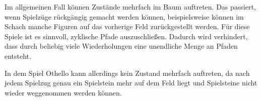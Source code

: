 Im allgemeinen Fall können Zustände mehrfach im Baum auftreten. Das passiert, wenn Spielzüge rückgängig gemacht werden
können, beispielsweise können im Schach manche Figuren auf das vorherige Feld zurückgestellt werden. Für diese Spiele
ist es sinnvoll, zyklische Pfade auszuschließen. Dadurch wird verhindert, dass durch beliebig viele Wiederholungen eine
unendliche Menge an Pfaden entsteht.
\cite[S.~75]{ai2010russel}

In dem Spiel Othello kann allerdings kein Zustand mehrfach auftreten, da nach jedem Spielzug genau ein Spielstein mehr
auf dem Feld liegt und Spielsteine nicht wieder weggenommen werden können.

